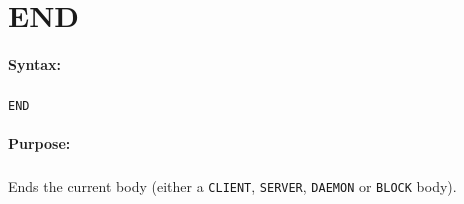 
\newpage
\section{END}
\label{cmd:END}

\paragraph{Syntax:}
\subparagraph{}
\texttt{END}

\paragraph{Purpose:}
\subparagraph{}
Ends the current body (either a \texttt{CLIENT}, \texttt{SERVER}, \texttt{DAEMON} 
or \texttt{BLOCK} body). 
